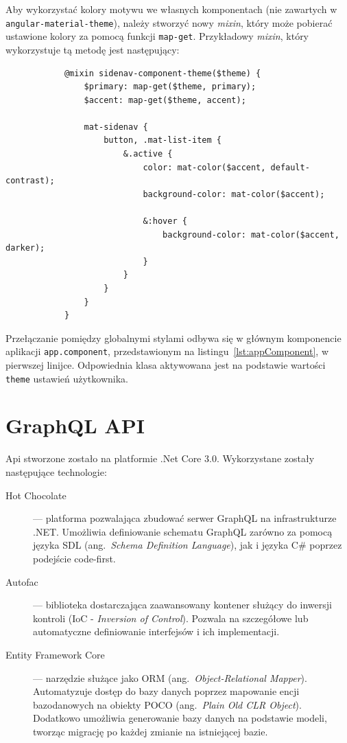 		Aby wykorzystać kolory motywu we własnych komponentach (nie zawartych w \verb|angular-material-theme|),
		należy stworzyć nowy \emph{mixin}, który może pobierać ustawione kolory za pomocą funkcji \verb|map-get|.
		Przykładowy \emph{mixin}, który wykorzystuje tą metodę jest następujący:
		\begin{lstlisting}
			@mixin sidenav-component-theme($theme) {
				$primary: map-get($theme, primary);
				$accent: map-get($theme, accent);
			
				mat-sidenav {
					button, .mat-list-item {
						&.active {
							color: mat-color($accent, default-contrast);
							background-color: mat-color($accent);
			
							&:hover {
								background-color: mat-color($accent, darker);
							}
						}
					}
				}
			}			
		\end{lstlisting}

		Przełączanie pomiędzy globalnymi stylami odbywa się w głównym komponencie aplikacji \verb|app.component|,
		przedstawionym na listingu~\ref{lst:appComponent}, w pierwszej linijce.
		Odpowiednia klasa aktywowana jest na podstawie wartości \verb|theme| ustawień użytkownika.

\section{GraphQL API}
	Api stworzone zostało na platformie .Net Core 3.0.
	Wykorzystane zostały następujące technologie:
	\begin{description}
		\item[Hot Chocolate] --- platforma pozwalająca zbudować serwer GraphQL na infrastrukturze .NET.
			Umożliwia definiowanie schematu GraphQL zarówno za pomocą języka SDL (ang.\ \emph{Schema Definition Language}),
			jak i języka C\# poprzez podejście code-first. 
		\item[Autofac] --- biblioteka dostarczająca zaawansowany kontener służący do inwersji kontroli (IoC - \emph{Inversion of Control}).
			Pozwala na szczegółowe lub automatyczne definiowanie interfejsów i ich implementacji.
		\item[Entity Framework Core] --- narzędzie służące jako ORM (ang.\ \emph{Object-Relational Mapper}).
			Automatyzuje dostęp do bazy danych poprzez mapowanie encji bazodanowych na obiekty POCO (ang.\ \emph{Plain Old CLR Object}).
			Dodatkowo umożliwia generowanie bazy danych na podstawie modeli, tworząc migrację po każdej zmianie na istniejącej bazie.
	\end{description}

